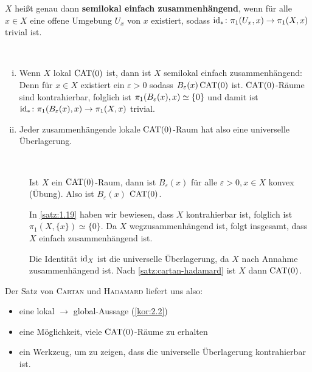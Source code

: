 $X$ heißt genau dann \textbf{semilokal einfach zusammenhängend}, wenn für alle $x \in X$ eine offene Umgebung $U_x$ von $x$ existiert, sodass $\operatorname{id}_*\colon \pi_1(U_x,x) \rightarrow \pi_1(X,x)$ trivial ist.

\begin{no-bem}
	\mbox{} \\[-1.4cm]
	\begin{enumerate}[(i)]
		\item Wenn $X$ lokal $\operatorname{CAT(0)}$ ist, dann ist $X$ semilokal einfach zusammenhängend:
		Denn für $x \in X$ existiert ein $\varepsilon > 0$ sodass $B_\varepsilon(x) \operatorname{CAT(0)}$ ist.
		$\operatorname{CAT(0)}$-Räume sind kontrahierbar, folglich ist $\pi_1(B_\varepsilon(x),x) \simeq \{0\}$ und damit ist $\operatorname{id}_*\colon \pi_1(B_\varepsilon(x),x) \rightarrow \pi_1(X,x)$ trivial.
		\item Jeder zusammenhängende lokale $\operatorname{CAT(0)}$-Raum hat also eine universelle Überlagerung.
	\end{enumerate}
\end{no-bem}

\begin{beweis}
	\mbox{} \\[-.9cm]
	\begin{description}
		\item[\bewrueck] Ist $X$ ein $\operatorname{CAT(0)}$-Raum, dann ist $B_\varepsilon(x)$ für alle $\varepsilon > 0, x \in X$ konvex (Übung). Also ist $B_\varepsilon(x)$ $\operatorname{CAT(0)}$.
		
		In \autoref{satz:1.19} haben wir bewiesen, dass $X$ kontrahierbar ist, folglich ist $\pi_1(X,\{x\}) \simeq \{0\}$.
		Da $X$ wegzusammenhängend ist, folgt insgesamt, dass $X$ einfach zusammenhängend ist.
		\item[\bewhin] Die Identität $\operatorname{id}_X$ ist die universelle Überlagerung, da $X$ nach Annahme zusammenhängend ist. Nach \autoref{satz:cartan-hadamard} ist $X$ dann $\operatorname{CAT(0)}$. \qedhere
	\end{description}
\end{beweis}

Der Satz von \textsc{Cartan} und \textsc{Hadamard} liefert uns also:
\begin{itemize}
	\item eine lokal $\rightarrow$ global-Aussage (\autoref{kor:2.2})
	\item eine Möglichkeit, viele $\operatorname{CAT(0)}$-Räume zu erhalten
	\item ein Werkzeug, um zu zeigen, dass die universelle Überlagerung kontrahierbar ist.
\end{itemize}


